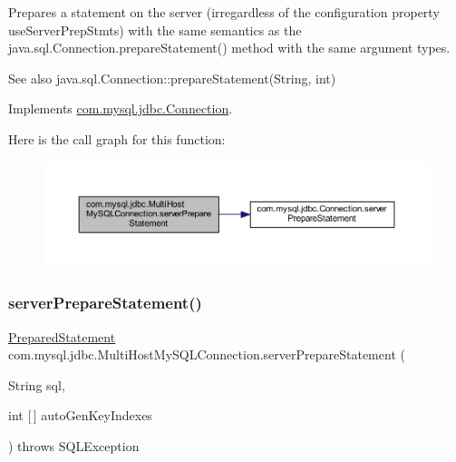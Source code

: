 Prepares a statement on the server (irregardless of the configuration property \textquotesingle{}use\+Server\+Prep\+Stmts\textquotesingle{}) with the same semantics as the java.\+sql.\+Connection.\+prepare\+Statement() method with the same argument types.

\begin{DoxySeeAlso}{See also}
java.\+sql.\+Connection\+::prepare\+Statement(\+String, int) 
\end{DoxySeeAlso}


Implements \mbox{\hyperlink{interfacecom_1_1mysql_1_1jdbc_1_1_connection_ab063bf6d934fba06ba65eaa68aa06ef6}{com.\+mysql.\+jdbc.\+Connection}}.

Here is the call graph for this function\+:
\nopagebreak
\begin{figure}[H]
\begin{center}
\leavevmode
\includegraphics[width=350pt]{classcom_1_1mysql_1_1jdbc_1_1_multi_host_my_s_q_l_connection_ab243fd44a8b19e2cf489e88a469dcee3_cgraph}
\end{center}
\end{figure}
\mbox{\label{classcom_1_1mysql_1_1jdbc_1_1_multi_host_my_s_q_l_connection_a62feb6ab7216c441bae377f5b7c738ac}} 
\subsubsection{\texorpdfstring{server\+Prepare\+Statement()}{serverPrepareStatement()}\hspace{0.1cm}{\footnotesize\ttfamily [4/6]}}
{\footnotesize\ttfamily \mbox{\hyperlink{classcom_1_1mysql_1_1jdbc_1_1_prepared_statement}{Prepared\+Statement}} com.\+mysql.\+jdbc.\+Multi\+Host\+My\+S\+Q\+L\+Connection.\+server\+Prepare\+Statement (\begin{DoxyParamCaption}\item[{String}]{sql,  }\item[{int \mbox{[}$\,$\mbox{]}}]{auto\+Gen\+Key\+Indexes }\end{DoxyParamCaption}) throws S\+Q\+L\+Exception}

